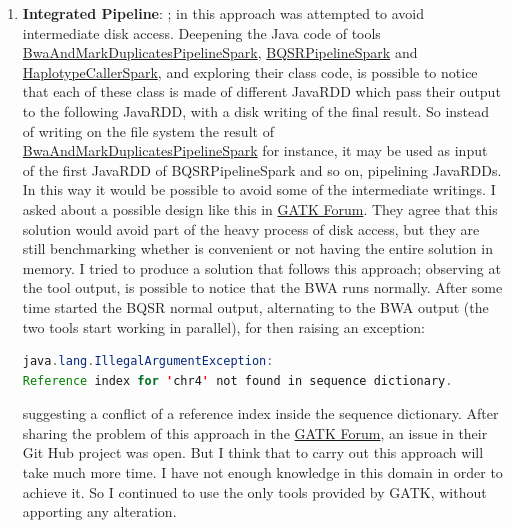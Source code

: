 \begin{enumerate}
  \item \textbf{Integrated Pipeline}: ; in this approach was attempted to avoid intermediate disk access. Deepening the Java code of tools \href{https://github.com/broadinstitute/gatk/blob/9e4e41cbf2740ec3e5d41a5d3bbf9365bb2b51dd/src/main/java/org/broadinstitute/hellbender/tools/spark/pipelines/BwaAndMarkDuplicatesPipelineSpark.java}{BwaAndMarkDuplicatesPipelineSpark}, \href{https://github.com/broadinstitute/gatk/blob/81c9dc49eb630abf723c24d763f9ee1eb13028c1/src/main/java/org/broadinstitute/hellbender/tools/spark/pipelines/BQSRPipelineSpark.java}{BQSRPipelineSpark} and \href{https://github.com/broadinstitute/gatk/blob/8d929ed89984137fc00009b322074f7a0908d2a5/src/main/java/org/broadinstitute/hellbender/tools/HaplotypeCallerSpark.java}{HaplotypeCallerSpark}, and exploring their class code, is possible to notice that each of these class is made of different JavaRDD which pass their output to the following JavaRDD, with a disk writing of the final result. So instead of writing on the file system the result of \href{https://github.com/broadinstitute/gatk/blob/9e4e41cbf2740ec3e5d41a5d3bbf9365bb2b51dd/src/main/java/org/broadinstitute/hellbender/tools/spark/pipelines/BwaAndMarkDuplicatesPipelineSpark.java}{BwaAndMarkDuplicatesPipelineSpark} for instance, it may be used as input of the first JavaRDD of BQSRPipelineSpark and so on, pipelining JavaRDDs. In this way it would be possible to avoid some of the intermediate writings. I asked about a possible design like this in \href{https://gatkforums.broadinstitute.org/gatk/discussion/comment/43588#Comment_43588}{GATK Forum}. They agree that this solution would avoid part of the heavy process of disk access, but they are still benchmarking whether is convenient or not having the entire solution in memory.\newline
I tried to produce a solution that follows this approach; observing at the tool output, is possible to notice that the BWA runs normally. After some time started the BQSR normal output, alternating to the BWA output (the two tools start working in parallel), for then raising an exception:
\begin{lstlisting}[language=Java,caption={Sequence Dictionary}]
java.lang.IllegalArgumentException: 
Reference index for 'chr4' not found in sequence dictionary.
\end{lstlisting}
suggesting a conflict of a reference index inside the sequence dictionary. After sharing the problem of this approach in the \href{https://gatkforums.broadinstitute.org/gatk/discussion/comment/43704#Comment_43704}{GATK Forum}, an issue in their Git Hub project was open. But I think that to carry out this approach will take much more time. I have not enough knowledge in this domain in order to achieve it. So I continued to use the only tools provided by GATK, without apporting any alteration.
\end{enumerate}



